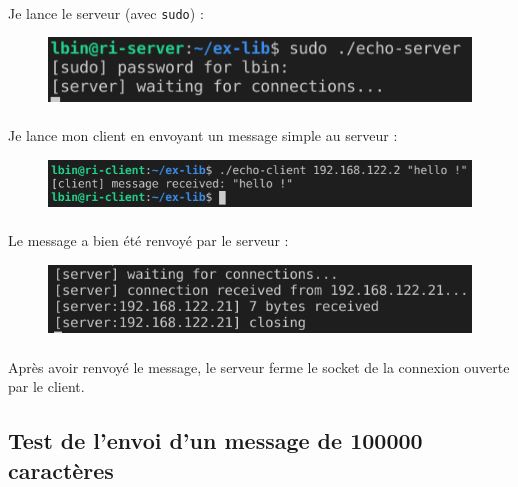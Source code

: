 \documentclass{article}
\begin{document}
    \paragraph{}
    Je lance le serveur (avec \texttt{sudo}) :
    \begin{figure}[H]
        \centering
        \includegraphics[width=.5\linewidth]{./screenshots/launch-server.png}
    \end{figure}

    \paragraph{}
    Je lance mon client en envoyant un message simple au serveur :
    \begin{figure}[H]
        \centering
        \includegraphics[width=.7\linewidth]{./screenshots/client-test-simple.png}
    \end{figure}

    \paragraph{}
    Le message a bien été renvoyé par le serveur :
    \begin{figure}[H]
        \centering
        \includegraphics[width=.6\linewidth]{./screenshots/server-test-simple.png}
    \end{figure}
    
    \paragraph{}
    Après avoir renvoyé le message, le serveur ferme le socket de la connexion ouverte par le client.

    \newpage
    \subsection{Test de l'envoi d'un message de 100000 caractères}
\end{document}

